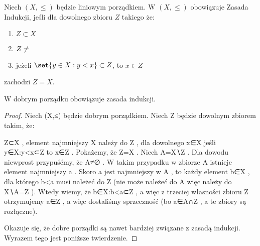 \begin{definition}
    Niech \( (X, \leq) \) będzie liniowym porządkiem. W \( (X, \leq) \) obowiązuje Zasada Indukcji,
    jeśli dla dowolnego zbioru \( Z \) takiego że:
    \begin{enumerate}
        \item \( Z \subset X \)
        \item \( Z \neq \empty \)
        \item jeżeli \( \set{y \in X : y < x} \subset Z \), to \( x \in Z \)
    \end{enumerate}
    zachodzi \( Z = X \).
\end{definition}

\begin{theorem}
    W dobrym porządku obowiązuje zasada indukcji.
\end{theorem}
\begin{proof}
    Niech (X,≤)
    będzie dobrym porządkiem. Niech Z
    będzie dowolnym zbiorem takim, że:
   
   Z⊂X
   ,
   element najmniejszy X
    należy do Z
   ,
   dla dowolnego x∈X
    jeśli {y∈X:y<x}⊂Z
    to x∈Z
   .
   Pokażemy, że Z=X
   . Niech A=X∖Z
   . Dla dowodu niewprost przypuśćmy, że A≠∅
   . W takim przypadku w zbiorze A
    istnieje element najmniejszy a
   . Skoro a
    jest najmniejszy w A
   , to każdy element b∈X
   , dla którego b<a
    musi należeć do Z
    (nie może należeć do A
    więc należy do X∖A=Z
   ). Wtedy wiemy, że {b∈X:b<a}⊂Z
   , a więc z trzeciej własności zbioru Z
    otrzymujemy a∈Z
   , a więc dostaliśmy sprzeczność (bo a∈A∩Z
   , a te zbiory są rozłączne).
   
   Okazuje się, że dobre porządki są nawet bardziej związane z zasadą indukcji. Wyrazem tego jest poniższe twierdzenie.
\end{proof}

